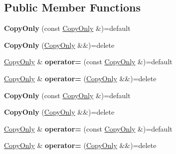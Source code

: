 \subsection*{Public Member Functions}
\begin{DoxyCompactItemize}
\item 
\mbox{\label{struct_copy_only_ad5fa83a011641d08f0ce8e57f7095aa0}} 
{\bfseries Copy\+Only} (const \mbox{\hyperlink{struct_copy_only}{Copy\+Only}} \&)=default
\item 
\mbox{\label{struct_copy_only_a2f4456b212b9209285e6b86b962028ad}} 
{\bfseries Copy\+Only} (\mbox{\hyperlink{struct_copy_only}{Copy\+Only}} \&\&)=delete
\item 
\mbox{\label{struct_copy_only_a0045661fdfa8b3912617ac7552a561d9}} 
\mbox{\hyperlink{struct_copy_only}{Copy\+Only}} \& {\bfseries operator=} (const \mbox{\hyperlink{struct_copy_only}{Copy\+Only}} \&)=default
\item 
\mbox{\label{struct_copy_only_a25c8de0929522c29b37e6359f2d2bdb9}} 
\mbox{\hyperlink{struct_copy_only}{Copy\+Only}} \& {\bfseries operator=} (\mbox{\hyperlink{struct_copy_only}{Copy\+Only}} \&\&)=delete
\item 
\mbox{\label{struct_copy_only_ad5fa83a011641d08f0ce8e57f7095aa0}} 
{\bfseries Copy\+Only} (const \mbox{\hyperlink{struct_copy_only}{Copy\+Only}} \&)=default
\item 
\mbox{\label{struct_copy_only_a2f4456b212b9209285e6b86b962028ad}} 
{\bfseries Copy\+Only} (\mbox{\hyperlink{struct_copy_only}{Copy\+Only}} \&\&)=delete
\item 
\mbox{\label{struct_copy_only_a0045661fdfa8b3912617ac7552a561d9}} 
\mbox{\hyperlink{struct_copy_only}{Copy\+Only}} \& {\bfseries operator=} (const \mbox{\hyperlink{struct_copy_only}{Copy\+Only}} \&)=default
\item 
\mbox{\label{struct_copy_only_a25c8de0929522c29b37e6359f2d2bdb9}} 
\mbox{\hyperlink{struct_copy_only}{Copy\+Only}} \& {\bfseries operator=} (\mbox{\hyperlink{struct_copy_only}{Copy\+Only}} \&\&)=delete
\item 

\end{DoxyCompactItemize}
